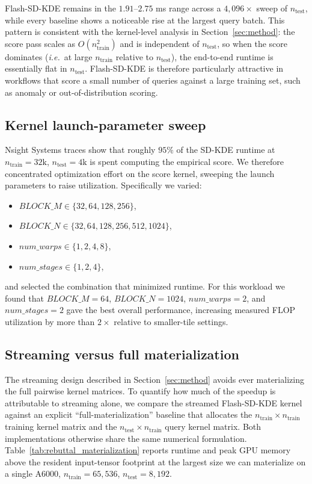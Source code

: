 Flash-SD-KDE remains in the $1.91$--$2.75$ ms range across a $4{,}096\times$
sweep of $n_{\text{test}}$, while every baseline shows a noticeable rise at
the largest query batch.
This pattern is consistent with the kernel-level analysis in
Section~\ref{sec:method}: the score pass scales as $O(n_{\text{train}}^2)$
and is independent of $n_{\text{test}}$, so when the score dominates
(\textit{i.e.}\ at large $n_{\text{train}}$ relative to $n_{\text{test}}$),
the end-to-end runtime is essentially flat in $n_{\text{test}}$.
Flash-SD-KDE is therefore particularly attractive in workflows that score a
small number of queries against a large training set, such as anomaly or
out-of-distribution scoring.


\subsection{Kernel launch-parameter sweep}
\label{app:kernel_tuning}

Nsight Systems traces show that roughly $95\%$ of the SD-KDE runtime at
$n_{\text{train}}=32\text{k}$, $n_{\text{test}}=4\text{k}$ is spent computing
the empirical score.  We therefore concentrated optimization effort on the
score kernel, sweeping the launch parameters to raise utilization.  Specifically
we varied:
\begin{itemize}
  \item $BLOCK\_M \in \{32, 64, 128, 256\}$,
  \item $BLOCK\_N \in \{32, 64, 128, 256, 512, 1024\}$,
  \item $num\_warps \in \{1, 2, 4, 8\}$,
  \item $num\_stages \in \{1, 2, 4\}$,
\end{itemize}
and selected the combination that minimized runtime.  For this workload we
found that $BLOCK\_M=64$, $BLOCK\_N=1024$, $num\_warps=2$, and $num\_stages=2$
gave the best overall performance, increasing measured FLOP utilization by
more than $2\times$ relative to smaller-tile settings.


\subsection{Streaming versus full materialization}
\label{app:streaming_ablation}

The streaming design described in Section~\ref{sec:method} avoids ever
materializing the full pairwise kernel matrices.
To quantify how much of the speedup is attributable to streaming alone, we
compare the streamed Flash-SD-KDE kernel against an explicit
``full-materialization'' baseline that allocates the
$n_{\text{train}} \times n_{\text{train}}$ training kernel matrix and the
$n_{\text{test}} \times n_{\text{train}}$ query kernel matrix.
Both implementations otherwise share the same numerical formulation.
Table~\ref{tab:rebuttal_materialization} reports runtime and peak GPU
memory above the resident input-tensor footprint at the largest size we can
materialize on a single A6000, $n_{\text{train}} = 65{,}536$,
$n_{\text{test}} = 8{,}192$.

